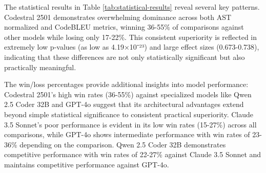 The statistical results in Table \ref{tab:statistical-results} reveal several key patterns. Codestral 2501 demonstrates overwhelming dominance across both AST normalized and CodeBLEU metrics, winning 36-55\% of comparisons against other models while losing only 17-22\%. This consistent superiority is reflected in extremely low p-values (as low as 4.19×10⁻²³) and large effect sizes (0.673-0.738), indicating that these differences are not only statistically significant but also practically meaningful.

The win/loss percentages provide additional insights into model performance: Codestral 2501's high win rates (36-55\%) against specialized models like Qwen 2.5 Coder 32B and GPT-4o suggest that its architectural advantages extend beyond simple statistical significance to consistent practical superiority. Claude 3.5 Sonnet's poor performance is evident in its low win rates (15-27\%) across all comparisons, while GPT-4o shows intermediate performance with win rates of 23-36\% depending on the comparison. Qwen 2.5 Coder 32B demonstrates competitive performance with win rates of 22-27\% against Claude 3.5 Sonnet and maintains competitive performance against GPT-4o.

